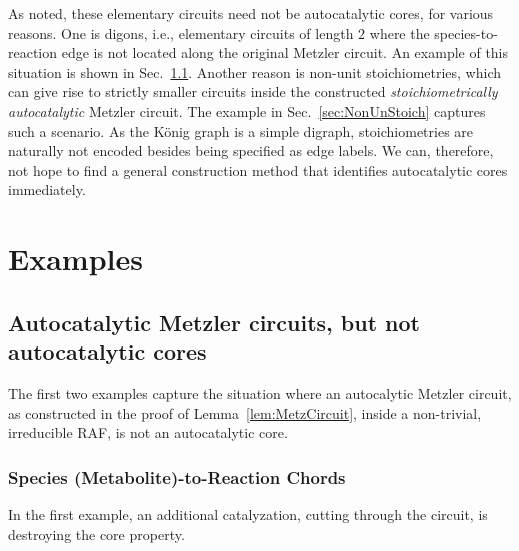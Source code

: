 \documentclass[pdflatex]{sn-jnl}
\theoremstyle{thmstyleone}%
\theoremstyle{examplesty}%
\theoremstyle{thmstylethree}%
\begin{document}
As noted, these elementary circuits need not be autocatalytic cores, for
various reasons.  One is digons, i.e., elementary circuits of length $2$
where the species-to-reaction edge is not located along the original
Metzler circuit. An example of this situation is shown in
Sec.~\ref{sec:MetzNotCore}.  Another reason is non-unit stoichiometries,
which can give rise to strictly smaller circuits inside the constructed
\emph{stoichiometrically autocatalytic} Metzler circuit. The example in
Sec.~\ref{sec:NonUnStoich} captures such a scenario. As the K\"onig graph
is a simple digraph, stoichiometries are naturally not encoded besides
being specified as edge labels. We can, therefore, not hope to find a
general construction method that identifies autocatalytic cores
immediately.

\section{Examples}

\subsection{Autocatalytic Metzler circuits, but not autocatalytic cores}\label{sec:MetzNotCore}

The first two examples capture the situation where an autocalytic Metzler
circuit, as constructed in the proof of Lemma~\ref{lem:MetzCircuit}, inside
a non-trivial, irreducible RAF, is not an autocatalytic core.

\subsubsection{Species (Metabolite)-to-Reaction Chords}\label{sec:MRChords}

In the first example, an additional catalyzation, cutting through the circuit, is
destroying the core property.
\end{document}
